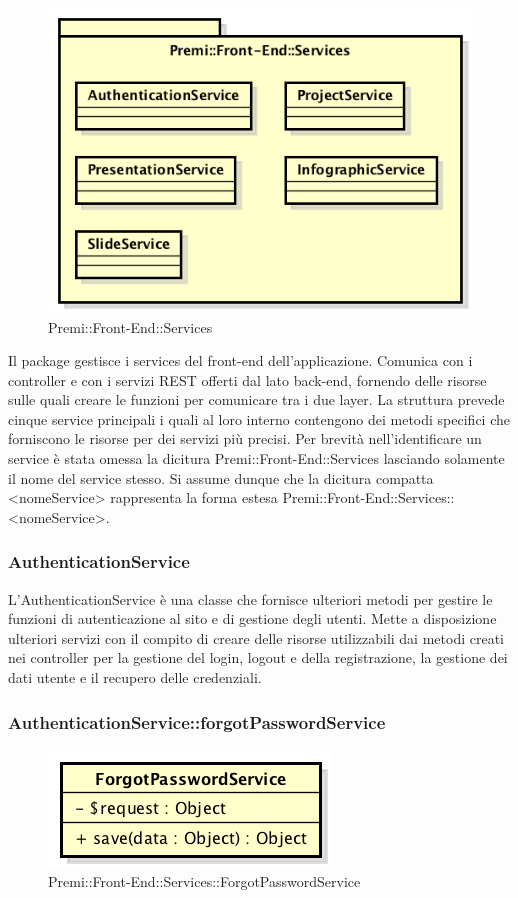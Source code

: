 \begin{figure}[h]
	\centering
	\includegraphics[width=0.7\linewidth]{img/premi_front_end_services}
	\caption[Premi::Front-End::Services]{Premi::Front-End::Services}
\end{figure}
Il package gestisce i services del front-end dell'applicazione. Comunica con i controller e con i servizi REST offerti dal lato back-end, fornendo delle risorse sulle quali creare le funzioni per comunicare tra i due layer. La struttura prevede cinque service principali i quali al loro interno contengono dei metodi specifici che forniscono le risorse per dei servizi più precisi.
Per brevità nell'identificare un service è stata omessa la dicitura Premi::Front-End::Services lasciando solamente il nome del service stesso. Si assume dunque che la dicitura compatta <nomeService> rappresenta la forma estesa Premi::Front-End::Services::<nomeService>.
\newpage


\subsubsection{AuthenticationService}
L'AuthenticationService è una classe che fornisce ulteriori metodi per gestire le funzioni di autenticazione al sito e di gestione degli utenti. Mette a disposizione ulteriori servizi con il compito di creare delle risorse utilizzabili dai metodi creati nei controller per la gestione del login, logout e della registrazione, la gestione dei dati utente e il recupero delle credenziali.

		\subsubsection{AuthenticationService::forgotPasswordService}
		\begin{figure}[h]
			\centering
				\includegraphics[width=0.4\linewidth]{img/premi_front_end_services_forgotpasswordservice}
			\caption[Premi::Front-End::Services::ForgotPasswordService]{Premi::Front-End::Services::ForgotPasswordService}
		\end{figure}
		
